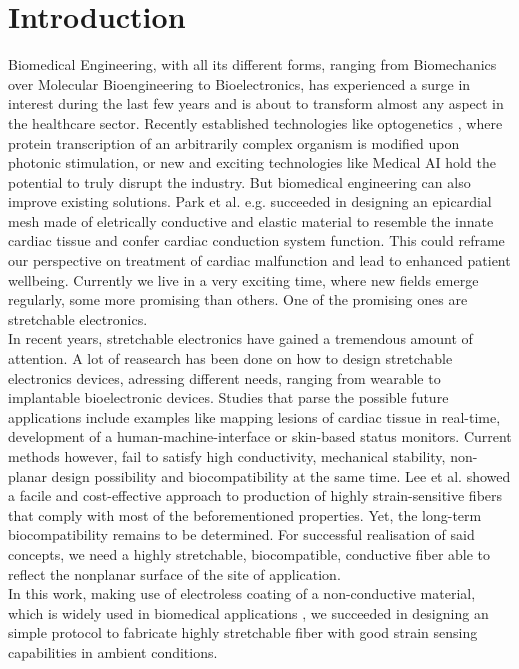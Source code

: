 \section{Introduction}
Biomedical Engineering, with all its different forms, ranging from Biomechanics over Molecular Bioengineering to Bioelectronics, has experienced a surge in interest during the last few years and is about to transform almost any aspect in the healthcare sector. \cite{BiomedicalIndustry} Recently established technologies like optogenetics \cite{Optogenetics}, where protein transcription of an arbitrarily complex organism is modified upon photonic stimulation, or new and exciting technologies like Medical AI \cite{MedicalAI} hold the potential to truly disrupt the industry. But biomedical engineering can also improve existing solutions. Park et al. \cite{EpicardialMesh} e.g. succeeded in designing an epicardial mesh made of eletrically conductive and elastic material to resemble the innate cardiac tissue and confer cardiac conduction system function. This could reframe our perspective on treatment of cardiac malfunction and lead to enhanced patient wellbeing. Currently we live in a very exciting time, where new fields emerge regularly, some more promising than others. One of the promising ones are stretchable electronics.\\
In recent years, stretchable electronics have gained a tremendous amount of attention. \cite{Cherenack, Lee} A lot of reasearch has been done on how to design stretchable electronics devices, adressing different needs, ranging from wearable to implantable bioelectronic devices. Studies that parse the possible future applications include examples like mapping lesions of cardiac tissue in real-time, development of a human-machine-interface or skin-based status monitors. \cite{Hochberg,Kim} Current methods however, fail to satisfy high conductivity, mechanical stability, non-planar design possibility and biocompatibility at the same time. Lee et al. \cite{Lee} showed a facile and cost-effective approach to production of highly strain-sensitive fibers that comply with most of the beforementioned properties. Yet, the long-term biocompatibility remains to be determined. For successful realisation of said concepts, we need a highly stretchable, biocompatible, conductive fiber able to reflect the nonplanar surface of the site of application.\\
In this work, making use of electroless coating of a non-conductive material, which is widely used in biomedical applications \cite{Pinchuk}, we succeeded in designing an simple protocol to fabricate  highly stretchable fiber with good strain sensing capabilities in ambient conditions.\\